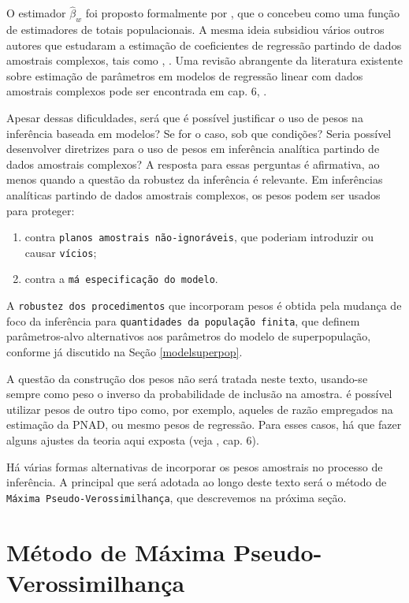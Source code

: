 \documentclass[]{book}
\numberwithin{example}{chapter}
\numberwithin{remark}{chapter}
\numberwithin{definition}{chapter}
\begin{document}
O estimador \(\widehat{\beta }_{w}\) foi proposto formalmente por
\citep{fuller75}, que o concebeu como uma função de estimadores de
totais populacionais. A mesma ideia subsidiou vários outros autores que
estudaram a estimação de coeficientes de regressão partindo de dados
amostrais complexos, tais como \citep{NH80}, \citep{PfefeNat}. Uma
revisão abrangente da literatura existente sobre estimação de parâmetros
em modelos de regressão linear com dados amostrais complexos pode ser
encontrada em cap. 6, \citep{Silva}.

Apesar dessas dificuldades, será que é possível justificar o uso de
pesos na inferência baseada em modelos? Se for o caso, sob que
condições? Seria possível desenvolver diretrizes para o uso de pesos em
inferência analítica partindo de dados amostrais complexos? A resposta
para essas perguntas é afirmativa, ao menos quando a questão da robustez
da inferência é relevante. Em inferências analíticas partindo de dados
amostrais complexos, os pesos podem ser usados para proteger:

\begin{enumerate}
\def\labelenumi{\arabic{enumi}.}
\item
  contra \texttt{planos\ amostrais\ não-ignoráveis}, que poderiam
  introduzir ou causar \texttt{vícios};
\item
  contra a \texttt{má\ especificação\ do\ modelo}.
\end{enumerate}

A \texttt{robustez\ dos\ procedimentos} que incorporam pesos é obtida
pela mudança de foco da inferência para
\texttt{quantidades\ da\ população\ finita}, que definem parâmetros-alvo
alternativos aos parâmetros do modelo de superpopulação, conforme já
discutido na Seção \ref{modelsuperpop}.

A questão da construção dos pesos não será tratada neste texto,
usando-se sempre como peso o inverso da probabilidade de inclusão na
amostra. é possível utilizar pesos de outro tipo como, por exemplo,
aqueles de razão empregados na estimação da PNAD, ou mesmo pesos de
regressão. Para esses casos, há que fazer alguns ajustes da teoria aqui
exposta (veja \citep{Silva}, cap. 6).

Há várias formas alternativas de incorporar os pesos amostrais no
processo de inferência. A principal que será adotada ao longo deste
texto será o método de \texttt{Máxima\ Pseudo-Verossimilhança}, que
descrevemos na próxima seção.

\section{Método de Máxima Pseudo-Verossimilhança}\label{modpar3}
\end{document}
